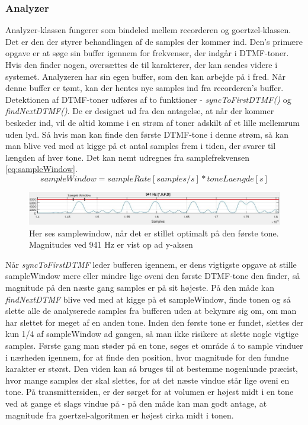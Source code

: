 \subsubsection{Analyzer}

Analyzer-klassen fungerer som bindeled mellem recorderen og goertzel-klassen. Det er den der styrer behandlingen af de samples der kommer ind. Den's primære opgave er at søge sin buffer igennem for frekvenser, der indgår i DTMF-toner. Hvis den finder nogen, oversættes de til karakterer, der kan sendes videre i systemet. Analyzeren har sin egen buffer, som den kan arbejde på i fred. Når denne buffer er tømt, kan der hentes nye samples ind fra recorderen's buffer. \\

Detektionen af DTMF-toner udføres af to funktioner - \textit{syncToFirstDTMF()} og \textit{findNextDTMF()}. De er designet ud fra den antagelse, at når der kommer beskeder ind, vil de altid komme i en strøm af toner adskilt af et lille mellemrum uden lyd. Så hvis man kan finde den første DTMF-tone i denne strøm, så kan man blive ved med at kigge på et antal samples frem i tiden, der svarer til længden af hver tone. Det kan nemt udregnes fra samplefrekvensen \eqref{eq:sampleWindow}. \\

\begin{equation}
sampleWindow=sampleRate[samples/s]*toneLaengde[s]
\label{eq:sampleWindow}
\end{equation}

\begin{figure}[h!]
\centering
\includegraphics[scale=0.5]{Billeder/Samplewindow.PNG}
\caption{Her ses samplewindow, når det er stillet optimalt på den første tone. Magnitudes ved 941 Hz er vist op ad y-aksen}
\label{fig:Samplewindow}
\end{figure}

Når \textit{syncToFirstDTMF} leder bufferen igennem, er dens vigtigste opgave at stille sampleWindow mere eller mindre lige oveni den første DTMF-tone den finder, så magnitude på den næste gang samples er på sit højeste. På den måde kan \textit{findNextDTMF} blive ved med at kigge på et sampleWindow, finde tonen og så slette alle de analyserede samples fra bufferen uden at bekymre sig om, om man har slettet for meget af en anden tone. Inden den første tone er fundet, slettes der kun 1/4 af sampleWindow ad gangen, så man ikke risikere at slette nogle vigtige samples. Første gang man støder på en tone, søges et område á to sample vinduer i nærheden igennem, for at finde den position, hvor magnitude for den fundne karakter er størst. Den viden kan så bruges til at bestemme nogenlunde præcist, hvor mange samples der skal slettes, for at det næste vindue står lige oveni en tone. På transmittersiden, er der sørget for at volumen er højest midt i en tone ved at gange et slags vindue på - på den måde kan man godt antage, at magnitude fra goertzel-algoritmen er højest cirka midt i tonen.


